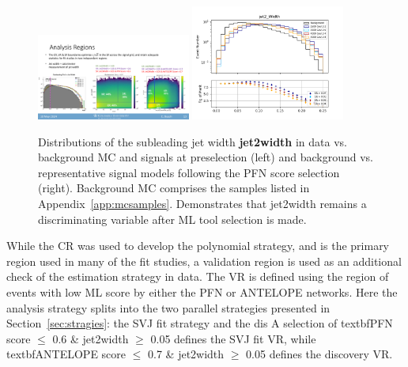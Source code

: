 \begin{figure}[!htbp]
\centering
   \includegraphics[width=0.45\textwidth]{figures/background/jet2width}
   \includegraphics[width=0.45\textwidth]{figures/background/jet2width_bkgsignal}
    \caption{Distributions of the subleading jet width \textbf{jet2width} in data vs. background MC and signals at preselection (left) and background vs. representative signal models following the PFN score selection (right). Background MC comprises the samples listed in Appendix~\ref{app:mcsamples}. Demonstrates that jet2width remains a discriminating variable after ML tool selection is made.
    \label{fig:jet2width}}
\end{figure}

While the CR was used to develop the polynomial strategy, and is the primary region used in many of the fit studies, a validation region is used as an additional check of the estimation strategy in data.
The VR is defined using the region of events with low ML score by either the PFN or ANTELOPE networks.
Here the analysis strategy splits into the two parallel strategies presented in Section~\ref{sec:stragies}: the SVJ fit strategy and the dis
A selection of textbf{PFN score $\leq$ 0.6 \& jet2width $\geq$ 0.05} defines the SVJ fit VR, while textbf{ANTELOPE score $\leq$ 0.7 \& jet2width $\geq$ 0.05} defines the discovery VR. 

